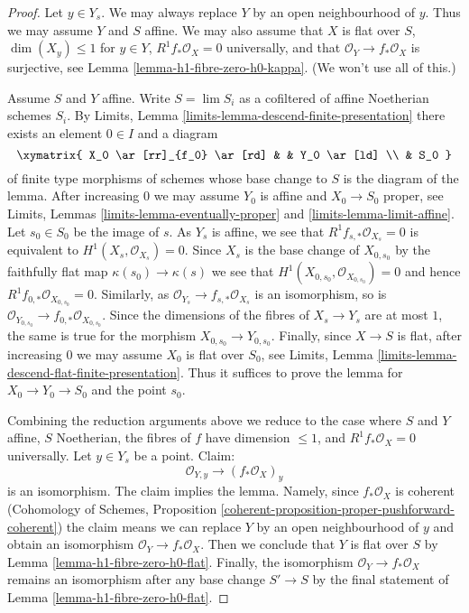 \begin{proof}
Let $y \in Y_s$. We may always replace $Y$ by an open neighbourhood of $y$.
Thus we may assume $Y$ and $S$ affine. We may also assume that
$X$ is flat over $S$, $\dim(X_y) \leq 1$ for $y \in Y$,
$R^1f_*\mathcal{O}_X = 0$ universally, and that
$\mathcal{O}_Y \to f_*\mathcal{O}_X$ is surjective, see
Lemma \ref{lemma-h1-fibre-zero-h0-kappa}. (We won't use all of this.)

\medskip\noindent
Assume $S$ and $Y$ affine.
Write $S = \lim S_i$ as a cofiltered of affine Noetherian schemes $S_i$.
By Limits, Lemma \ref{limits-lemma-descend-finite-presentation}
there exists an element $0 \in I$ and a diagram
$$
\xymatrix{
X_0 \ar[rr]_{f_0} \ar[rd] & & Y_0 \ar[ld] \\
& S_0
}
$$
of finite type morphisms of schemes whose base change to $S$
is the diagram of the lemma. After increasing $0$ we may assume $Y_0$
is affine and $X_0 \to S_0$ proper, see
Limits, Lemmas \ref{limits-lemma-eventually-proper} and
\ref{limits-lemma-limit-affine}.
Let $s_0 \in S_0$ be the image of $s$.
As $Y_s$ is affine, we see that
$R^1f_{s, *}\mathcal{O}_{X_s} = 0$ is equivalent
to $H^1(X_s, \mathcal{O}_{X_s}) = 0$.
Since $X_s$ is the base change of $X_{0, s_0}$ by
the faithfully flat map $\kappa(s_0) \to \kappa(s)$
we see that $H^1(X_{0, s_0}, \mathcal{O}_{X_{0, s_0}}) = 0$
and hence $R^1f_{0, *}\mathcal{O}_{X_{0, s_0}} = 0$.
Similarly, as $\mathcal{O}_{Y_s} \to f_{s, *}\mathcal{O}_{X_s}$
is an isomorphism, so is
$\mathcal{O}_{Y_{0, s_0}} \to f_{0, *}\mathcal{O}_{X_{0, s_0}}$.
Since the dimensions of the fibres of $X_s \to Y_s$ are at most $1$,
the same is true for the morphism $X_{0, s_0} \to Y_{0, s_0}$.
Finally, since $X \to S$ is flat, after increasing $0$
we may assume $X_0$ is flat over $S_0$, see
Limits, Lemma \ref{limits-lemma-descend-flat-finite-presentation}.
Thus it suffices to prove the lemma for
$X_0 \to Y_0 \to S_0$ and the point $s_0$.

\medskip\noindent
Combining the reduction arguments above we reduce to the case where
$S$ and $Y$ affine, $S$ Noetherian, the fibres of $f$ have dimension
$\leq 1$, and $R^1f_*\mathcal{O}_X = 0$ universally.
Let $y \in Y_s$ be a point. Claim:
$$
\mathcal{O}_{Y, y} \longrightarrow (f_*\mathcal{O}_X)_y
$$
is an isomorphism. The claim implies the lemma. Namely, since
$f_*\mathcal{O}_X$ is coherent (Cohomology of Schemes, Proposition
\ref{coherent-proposition-proper-pushforward-coherent})
the claim means we can replace $Y$ by an open neighbourhood of $y$
and obtain an isomorphism $\mathcal{O}_Y \to f_*\mathcal{O}_X$.
Then we conclude that $Y$ is flat over $S$
by Lemma \ref{lemma-h1-fibre-zero-h0-flat}.
Finally, the isomorphism $\mathcal{O}_Y \to f_*\mathcal{O}_X$
remains an isomorphism after any base change $S' \to S$
by the final statement of Lemma \ref{lemma-h1-fibre-zero-h0-flat}.


\end{proof}
